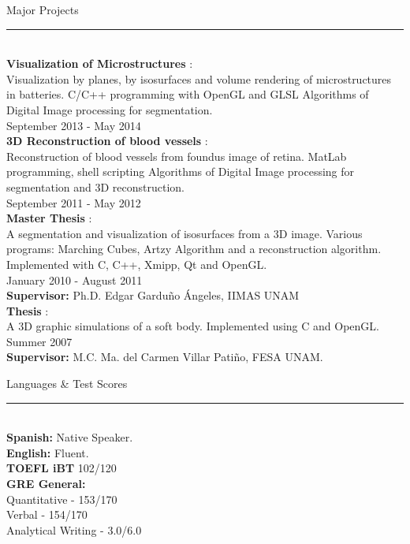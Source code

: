 \documentclass[letterpaper,10pt]{article}
\begin{document}
\begin{minipage}{0.4\textwidth} 
\vspace*{-3.0cm}
{\large{Major Projects}} \\
\textcolor{Dandelion}{\rule{0.5\textwidth}{0.05in}} \\
\textbf{Visualization of Microstructures} : \\
Visualization by planes, by isosurfaces and volume rendering of microstructures in batteries.
C/C++ programming with OpenGL and GLSL
Algorithms of Digital Image processing for segmentation.\\
September 2013 -  May 2014\\

\textbf{3D Reconstruction of blood vessels} : \\
Reconstruction of blood vessels from foundus image of retina.
MatLab programming, shell scripting 
Algorithms of Digital Image processing for segmentation and 3D reconstruction.\\
September 2011 -  May 2012\\

\textbf{Master Thesis} : \\
A segmentation and visualization of isosurfaces from a 3D image. Various programs: Marching Cubes,  Artzy Algorithm and  a reconstruction algorithm. Implemented with C, C++, Xmipp, Qt and OpenGL.\\
January 2010 - August 2011 \\
\textbf{Supervisor:} Ph.D. Edgar Gardu\~{n}o \'{A}ngeles, IIMAS UNAM \\

\textbf{Thesis} : \\
A 3D graphic simulations of a soft body. Implemented using C and OpenGL. \\
Summer 2007 \\
\textbf{Supervisor:} M.C. Ma. del Carmen Villar Pati\~{n}o, FESA UNAM. \\

\vspace*{1.5cm}

\large{Languages \& Test Scores} \\
\textcolor{Dandelion}{\rule{0.7\textwidth}{0.05in}} \\
\textbf{Spanish:} Native Speaker. \\
\textbf{English:} \hspace*{0.1cm} Fluent. \\
\textbf{TOEFL iBT} 102/120 \\
\textbf{GRE General:}  \\
\hspace*{0.5cm}Quantitative - 153/170 \\
\hspace*{0.5cm}Verbal - 154/170 \\
\hspace*{0.5cm}Analytical Writing - 3.0/6.0\\
\end{minipage} 
\end{document}
